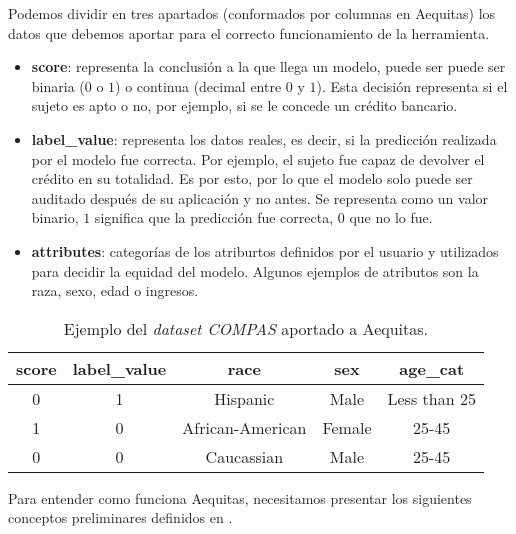 Podemos dividir en tres apartados (conformados por columnas en Aequitas) los datos que debemos aportar para el correcto funcionamiento de la herramienta.

\begin{itemize}
    \item \textbf{score}: representa la conclusión a la que llega un modelo, puede ser puede ser binaria ($0$ o $1$) o continua (decimal entre $0$ y $1$). Esta decisión representa si el sujeto es apto o no, por ejemplo, si se le concede un crédito bancario.
    \item \textbf{label\_value}: representa los datos reales, es decir, si la predicción realizada por el modelo fue correcta. Por ejemplo, el sujeto fue capaz de devolver el crédito en su totalidad. Es por esto, por lo que el modelo solo puede ser auditado después de su aplicación y no antes. Se representa como un valor binario, $1$ significa que la predicción fue correcta, $0$ que no lo fue.
    \item \textbf{attributes}: categorías de los atriburtos definidos por el usuario y utilizados para decidir la equidad del modelo. Algunos ejemplos de atributos son la raza, sexo, edad o ingresos.
\end{itemize}

\begin{table}[h]
\centering
\resizebox{12.0cm}{!} {
\begin{tabular}{|c|c|c|c|c|}
\hline
\textbf{score} & \textbf{label\_value} & \textbf{race}    & \textbf{sex} & \textbf{age\_cat} \\ \hline
0              & 1                     & Hispanic         & Male         & Less than 25      \\ \hline
1              & 0                     & African-American & Female       & 25-45             \\ \hline
0              & 0                     & Caucassian       & Male         & 25-45             \\ \hline
\end{tabular}
}
\caption{Ejemplo del \textit{dataset COMPAS} aportado a Aequitas.}
\label{tab:ejcompasaeq}
\end{table}



Para entender como funciona Aequitas, necesitamos presentar los siguientes conceptos preliminares definidos en \cite{aequitasdoc}.

